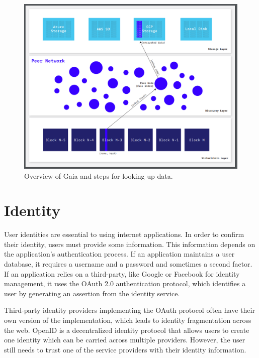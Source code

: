		\begin{figure}[h]
			\includegraphics[width=\linewidth]{figures/gaia-overview}
			\caption{\label{fig:gaia-overview} Overview of Gaia and steps for looking up data.\protect\cite{blockstack2019whitepaper}}
		\end{figure}
		
\cleardoublepage
\section{Identity}
	User identities are essential to using internet applications. In order to confirm their identity, users must provide some information. This information depends on the application's authentication process. If an application maintains a user database, it requires a username and a password and sometimes a second factor. If an application relies on a third-party, like Google\cite{identity:google:1} or Facebook\cite{identity:facebook:1} for identity management, it uses the OAuth 2.0 authentication\cite{hardt2012oauth} protocol, which identifies a user by generating an assertion from the identity service.
	
	Third-party identity providers implementing the OAuth protocol often have their own version of the implementation, which leads to identity fragmentation across the web. OpenID\cite{recordon2006openid} is a decentralized identity protocol that allows users to create one identity which can be carried across multiple providers. However, the user still needs to trust one of the service providers with their identity information\cite{raval2016decentralized}.
	
